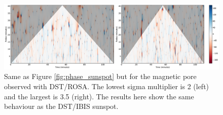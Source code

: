     \begin{figure}
     	\centering
     	\includegraphics[width=1\textwidth]{pore_phase.pdf}
     	\caption{
	             		Same as Figure \ref{fig:phase_sunspot} but for the magnetic pore observed with DST/ROSA.
	             		The lowest sigma multiplier is 2 (left) and the largest is 3.5 (right).
	             		The results here show the same behaviour as the DST/IBIS sunspot.
     		          }
     	\label{fig:phase_pore}
    \end{figure}